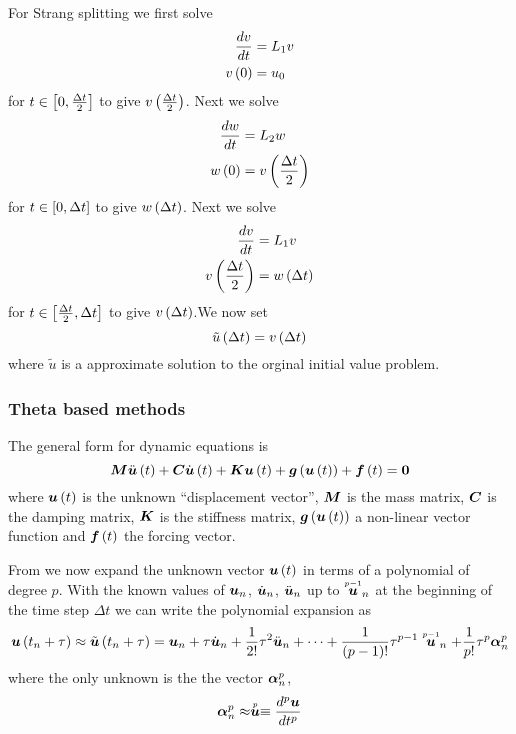 For Strang splitting we first solve
\begin{align}
   \dfrac{ d v}{d t} &=L_{1}v \\
   v\left( 0 \right) &=u_{0}
\end{align}
for $t\in\left[ 0,\frac{\Delta t}{2} \right]$ to give $ v\left( \frac{\Delta t}{2} \right) $. Next we solve
\begin{align}
   \dfrac{ d w}{d t} &=L_{2}w \\
   w\left( 0 \right) &= v\left( \frac{\Delta t}{2} \right) 
\end{align}
for $t\in\left[ 0,\Delta t \right]$ to give $ w\left( \Delta t \right) $. Next we solve
\begin{align}
   \dfrac{ d v}{d t} &=L_{1}v \\
   v\left( \frac{\Delta t}{2} \right) &= w\left( \Delta t \right) 
\end{align}
for $t\in\left[ \frac{\Delta t}{2},\Delta t \right]$ to give $ v\left( \Delta t \right) $.We now set
\begin{equation}
 \tilde{u}\left( \Delta t \right) = v\left( \Delta t \right) 
\end{equation}
where $\tilde{u}$ is a approximate solution to the orginal initial value
problem. 

\subsubsection{Theta based methods}
\label{subsubsec:DynamicThetaBasedMethods}

The general form for dynamic equations is
\begin{equation}
  \matr{M}\fnof{\ddot{\vectr{u}}}{t}+\matr{C}\fnof{\dot{\vectr{u}}}{t}+\matr{K}\fnof{\vectr{u}}{t}+
  \fnof{\vectr{g}}{\fnof{\vectr{u}}{t}}+\fnof{\vectr{f}}{t}=\vectr{0}
  \label{eqn:generaldynamicnonlinear}
\end{equation}
where $  \boldsymbol{u} \left( t \right) $ is the unknown ``displacement vector'', $\matr{M}$
is the mass matrix, $\matr{C}$ is the damping matrix, $\matr{K}$ is the
stiffness matrix, $  \boldsymbol{g} \left(   \boldsymbol{u} \left( t \right)  \right) $ a non-linear vector
function and $  \boldsymbol{f} \left( t \right) $ the forcing vector.

From \citet{zienkiewicz:2006_1} we now expand the unknown vector $  \boldsymbol{u} \left( t \right) $ in terms of a polynomial of degree
$p$. With the known values of $ \boldsymbol{u} _{n}$, $\dot{ \boldsymbol{u} }_{n}$,
$\ddot{ \boldsymbol{u} }_{n}$ up to $ \stackrel{\scriptscriptstyle p-1}{ \boldsymbol{u} } _{n}$ at the beginning of
the time step $\Delta t$ we can write the polynomial expansion as
\begin{equation}
  \fnof{\vectr{u}}{t_{n}+\tau}\approx\fnof{\tilde{\vectr{u}}}{t_{n}+\tau}=\vectr{u}_{n}+\tau\dot{\vectr{u}}_{n}+
  \frac{1}{2!}\tau^{2}\ddot{\vectr{u}}_{n}+\cdots+\dfrac{1}{\factorial{p-1}}\tau^{p-1}\symover{p-1}{\vectr{u}}_{n}+
  \dfrac{1}{p!}\tau^{p}\vectr{\alpha}^{p}_{n}
  \label{eqn:timepolyexpansion}
\end{equation}
where the only unknown is the the vector $ \boldsymbol{\alpha} ^{p}_{n}$,
\begin{equation}
   \boldsymbol{\alpha} ^{p}_{n}\approx \stackrel{\scriptscriptstyle p}{ \boldsymbol{u} } \equiv \dfrac{ d^{p}  \boldsymbol{u} }{d {t}^{p}} 
\end{equation}

